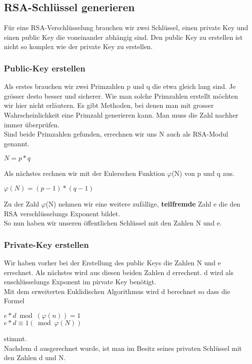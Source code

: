 \subsection{RSA-Schlüssel generieren}
Für eine RSA-Verschlüsselung brauchen wir zwei Schlüssel, einen private Key und einen public Key die voneinander abhängig sind. Den public Key zu erstellen ist nicht so komplex wie der private Key zu erstellen.
\subsubsection{Public-Key erstellen}
Als erstes brauchen wir zwei Primzahlen p und q die etwa gleich lang sind. Je grösser desto besser und sicherer. Wie man solche Primzahlen erstellt möchten wir hier nicht erläutern. Es gibt Methoden, bei denen man mit grosser Wahrscheinlichkeit eine Primzahl generieren kann. Man muss die Zahl nachher immer überprüfen.\\
Sind beide Primzahlen gefunden, errechnen wir uns N auch als RSA-Modul genannt.
\begin{center}
$ N = p * q $
\end{center}
Als nächstes rechnen wir mit der Eulerschen Funktion $\varphi$(N) von p und q aus. 
\begin{center}
$ \varphi(N) = (p - 1) * (q - 1) $
\end{center}
Zu der Zahl $\varphi$(N) nehmen wir eine weitere zufällige, \textbf{teilfremde} Zahl e die den RSA verschlüsselungs Exponent bildet.\\
So nun haben wir unseren öffentlichen Schlüssel mit den Zahlen N und e.
\subsubsection{Private-Key erstellen}
Wir haben vorher bei der Erstellung des public Keys die Zahlen N und e errechnet. Als nächstes wird aus diesen beiden Zahlen d errechent. d wird als enschlüsselungs Exponent im pirvate Key benötigt.\\
Mit dem erweiterten Euklidischen Algorithmus wird d berechnet so dass die Formel
\begin{center}
$ e * d \bmod(\varphi(n)) = 1 $\\
$ e * d \equiv 1 (\bmod \varphi(N) ) $
\end{center}
stimmt. \\
Nachdem d ausgerechnet wurde, ist man im Besitz seines privaten Schlüssel mit den Zahlen d und N.

